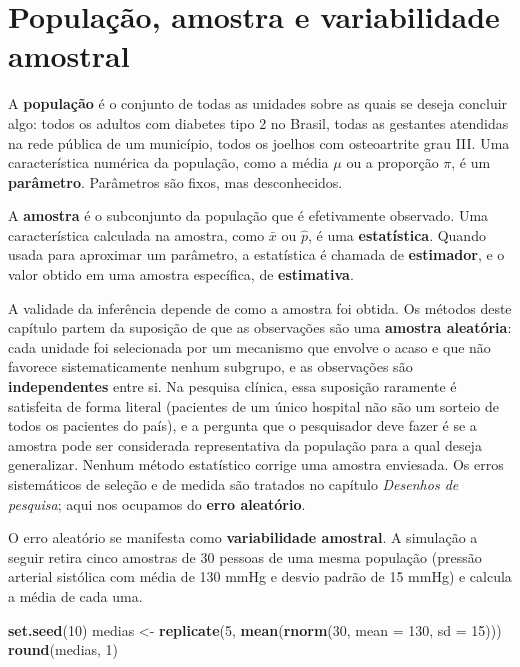 \documentclass[
]{book}
\newenvironment{Shaded}{\begin{snugshade}}{\end{snugshade}}
\newcommand{\AttributeTok}[1]{\textcolor[rgb]{0.13,0.29,0.53}{#1}}
\newcommand{\DecValTok}[1]{\textcolor[rgb]{0.00,0.00,0.81}{#1}}
\newcommand{\FunctionTok}[1]{\textcolor[rgb]{0.13,0.29,0.53}{\textbf{#1}}}
\newcommand{\NormalTok}[1]{#1}
\newcommand{\OtherTok}[1]{\textcolor[rgb]{0.56,0.35,0.01}{#1}}
\begin{document}
\section{População, amostra e variabilidade amostral}\label{populauxe7uxe3o-amostra-e-variabilidade-amostral}

A \textbf{população} é o conjunto de todas as unidades sobre as quais se deseja concluir algo: todos os adultos com diabetes tipo 2 no Brasil, todas as gestantes atendidas na rede pública de um município, todos os joelhos com osteoartrite grau III. Uma característica numérica da população, como a média \(\mu\) ou a proporção \(\pi\), é um \textbf{parâmetro}. Parâmetros são fixos, mas desconhecidos.

A \textbf{amostra} é o subconjunto da população que é efetivamente observado. Uma característica calculada na amostra, como \(\bar{x}\) ou \(\hat{p}\), é uma \textbf{estatística}. Quando usada para aproximar um parâmetro, a estatística é chamada de \textbf{estimador}, e o valor obtido em uma amostra específica, de \textbf{estimativa}.

A validade da inferência depende de como a amostra foi obtida. Os métodos deste capítulo partem da suposição de que as observações são uma \textbf{amostra aleatória}: cada unidade foi selecionada por um mecanismo que envolve o acaso e que não favorece sistematicamente nenhum subgrupo, e as observações são \textbf{independentes} entre si. Na pesquisa clínica, essa suposição raramente é satisfeita de forma literal (pacientes de um único hospital não são um sorteio de todos os pacientes do país), e a pergunta que o pesquisador deve fazer é se a amostra pode ser considerada representativa da população para a qual deseja generalizar. Nenhum método estatístico corrige uma amostra enviesada. Os erros sistemáticos de seleção e de medida são tratados no capítulo \emph{Desenhos de pesquisa}; aqui nos ocupamos do \textbf{erro aleatório}.

O erro aleatório se manifesta como \textbf{variabilidade amostral}. A simulação a seguir retira cinco amostras de 30 pessoas de uma mesma população (pressão arterial sistólica com média de 130 mmHg e desvio padrão de 15 mmHg) e calcula a média de cada uma.

\begin{Shaded}
\begin{Highlighting}[]
\FunctionTok{set.seed}\NormalTok{(}\DecValTok{10}\NormalTok{)}
\NormalTok{medias }\OtherTok{\textless{}{-}} \FunctionTok{replicate}\NormalTok{(}\DecValTok{5}\NormalTok{, }\FunctionTok{mean}\NormalTok{(}\FunctionTok{rnorm}\NormalTok{(}\DecValTok{30}\NormalTok{, }\AttributeTok{mean =} \DecValTok{130}\NormalTok{, }\AttributeTok{sd =} \DecValTok{15}\NormalTok{)))}
\FunctionTok{round}\NormalTok{(medias, }\DecValTok{1}\NormalTok{)}
\end{Highlighting}
\end{Shaded}
\end{document}
